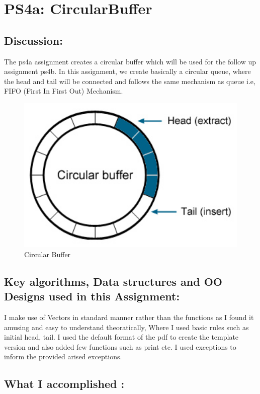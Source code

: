 \section{PS4a: CircularBuffer}\label{sec:ps4a}
\graphicspath{{ps4a}}
\subsection{Discussion:}\label{sec:ps4a:disc}
 The ps4a assignment creates a circular buffer which will be used for the follow up assignment ps4b. In this assignment, we create basically a circular queue, where the head and tail will be connected and follows the same mechanism as queue i.e, FIFO (First In First Out) Mechanism. 
 \begin{figure}[h]
    \centering
    \includegraphics[width=1\textwidth]{ps4a/cb.jpg}
    \caption{Circular Buffer}
    \label{fig:cb}
\end{figure}
\subsection{Key algorithms, Data structures and OO Designs used in this Assignment:}
 I make use of Vectors in standard manner rather than the functions as I found it amusing and easy to understand theoratically, Where I used basic rules such as initial head, tail.
 I used the default format of the pdf to create the template version and also added few functions such as print etc.
 I used exceptions to inform the provided arised exceptions.

\subsection{What I accomplished :}

